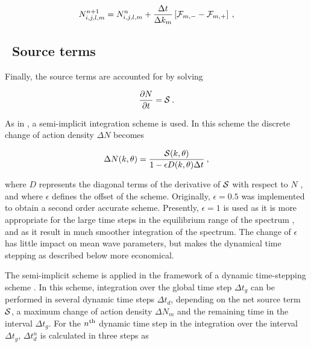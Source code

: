 
\begin{equation}
N_{i,j,l,m}^{n+1} = N_{i,j,l,m}^n 
 + \frac{\Delta t}{\Delta k_m} \left [ {\cal F}_{m,-} - {\cal F}_{m,+} \right ]
\: , \label{eq:uq_k_tot} \end{equation}


\vssub
\subsection{~Source terms} \label{sub:source}
\vssub

Finally, the source terms are accounted for by solving


\begin{equation}
\frac{\partial N}{\partial t} = {\cal S} \: . \label{eq:step_source}
\end{equation}

\noindent 
As in \wam, a semi-implicit integration scheme is used. In this scheme the
discrete change of action density $\Delta N$ becomes \citep{art:WAM88}


\begin{equation}
\Delta N(k,\theta) = \frac{{\cal S}(k,\theta)}{1- \epsilon D(k,\theta)\Delta t}
\: , \label{eq:implicit_st} \end{equation}

\noindent 
where $D$ represents the diagonal terms of the derivative of ${\cal S}$ with
respect to $N$ \citep[Eqs. 4.1 through 4.10]{art:WAM88}, and where $\epsilon$
defines the offset of the scheme. Originally, $\epsilon = 0.5$ was implemented
to obtain a second order accurate scheme. Presently, $\epsilon = 1$ is used as
it is more appropriate for the large time steps in the equilibrium range of
the spectrum \citep{pro:HA98,art:HA01}, and as it result in much smoother
integration of the spectrum. The change of $\epsilon$ has little impact on
mean wave parameters, but makes the dynamical time stepping as described below
more economical.

The semi-implicit scheme is applied in the framework of a dynamic
time-stepping scheme \citep{tol:JPO92}. In this scheme, integration over the
global time step $\Delta t_g$ can be performed in several dynamic time steps
$\Delta t_d$, depending on the net source term ${\cal S}$, a maximum change of
action density $\Delta N_m$ and the remaining time in the interval $\Delta
t_g$. For the $n^{\rm th}$ dynamic time step in the integration over the
interval $\Delta t_g$, $\Delta t_d^n$ is calculated in three steps as

